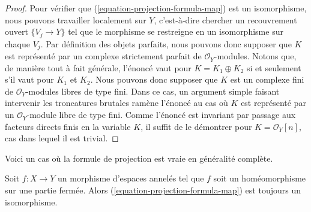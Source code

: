\begin{proof}

Pour vérifier que (\ref{equation-projection-formula-map}) est un isomorphisme, nous pouvons travailler localement sur $Y$, c'est-à-dire chercher un recouvrement ouvert
$\{V_j \to Y\}$
tel que le morphisme se restreigne en un isomorphisme sur chaque $V_j$. Par définition des objets parfaits, nous pouvons donc supposer que $K$ est représenté par un complexe strictement parfait de $\mathcal{O}_Y$-modules. Notons que, de manière tout à fait générale, l'énoncé vaut pour
$K = K_1 \oplus K_2$ si et seulement s'il vaut pour
$K_1$ et $K_2$. Nous pouvons donc supposer que $K$ est un complexe fini de $\mathcal{O}_Y$-modules libres de type fini. Dans ce cas, un argument simple faisant intervenir les troncatures brutales ramène l'énoncé au cas où $K$ est représenté par un $\mathcal{O}_Y$-module libre de type fini. Comme l'énoncé est invariant par passage aux facteurs directs finis en la variable $K$, il suffit de le démontrer pour $K = \mathcal{O}_Y[n]$,
cas dans lequel il est trivial.

\end{proof}

\noindent
Voici un cas où la formule de projection est vraie en généralité complète.

\begin{lemma}

\label{lemma-projection-formula-closed-immersion}
Soit $f : X \to Y$ un morphisme d'espaces annelés tel que $f$ soit un homéomorphisme sur une partie fermée. Alors (\ref{equation-projection-formula-map}) est toujours un isomorphisme.
\end{lemma}

